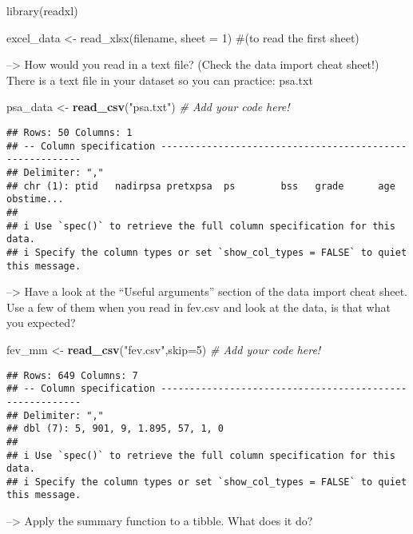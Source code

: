 \documentclass[
]{article}
\newenvironment{Shaded}{\begin{snugshade}}{\end{snugshade}}
\newcommand{\AttributeTok}[1]{\textcolor[rgb]{0.13,0.29,0.53}{#1}}
\newcommand{\CommentTok}[1]{\textcolor[rgb]{0.56,0.35,0.01}{\textit{#1}}}
\newcommand{\DecValTok}[1]{\textcolor[rgb]{0.00,0.00,0.81}{#1}}
\newcommand{\FunctionTok}[1]{\textcolor[rgb]{0.13,0.29,0.53}{\textbf{#1}}}
\newcommand{\NormalTok}[1]{#1}
\newcommand{\OtherTok}[1]{\textcolor[rgb]{0.56,0.35,0.01}{#1}}
\newcommand{\StringTok}[1]{\textcolor[rgb]{0.31,0.60,0.02}{#1}}
\begin{document}
library(readxl)

excel\_data \textless- read\_xlsx(filename, sheet = 1) \#(to read the
first sheet)

--\textgreater{} How would you read in a text file? (Check the data
import cheat sheet!) There is a text file in your dataset so you can
practice: psa.txt

\begin{Shaded}
\begin{Highlighting}[]
\NormalTok{psa\_data }\OtherTok{\textless{}{-}} \FunctionTok{read\_csv}\NormalTok{(}\StringTok{"psa.txt"}\NormalTok{) }\CommentTok{\# Add your code here!}
\end{Highlighting}
\end{Shaded}

\begin{verbatim}
## Rows: 50 Columns: 1
## -- Column specification --------------------------------------------------------
## Delimiter: ","
## chr (1): ptid   nadirpsa pretxpsa  ps        bss   grade      age    obstime...
## 
## i Use `spec()` to retrieve the full column specification for this data.
## i Specify the column types or set `show_col_types = FALSE` to quiet this message.
\end{verbatim}

--\textgreater{} Have a look at the ``Useful arguments'' section of the
data import cheat sheet. Use a few of them when you read in fev.csv and
look at the data, is that what you expected?

\begin{Shaded}
\begin{Highlighting}[]
\NormalTok{fev\_mm }\OtherTok{\textless{}{-}} \FunctionTok{read\_csv}\NormalTok{(}\StringTok{"fev.csv"}\NormalTok{,}\AttributeTok{skip=}\DecValTok{5}\NormalTok{) }\CommentTok{\# Add your code here!}
\end{Highlighting}
\end{Shaded}

\begin{verbatim}
## Rows: 649 Columns: 7
## -- Column specification --------------------------------------------------------
## Delimiter: ","
## dbl (7): 5, 901, 9, 1.895, 57, 1, 0
## 
## i Use `spec()` to retrieve the full column specification for this data.
## i Specify the column types or set `show_col_types = FALSE` to quiet this message.
\end{verbatim}

--\textgreater{} Apply the summary function to a tibble. What does it
do?
\end{document}
